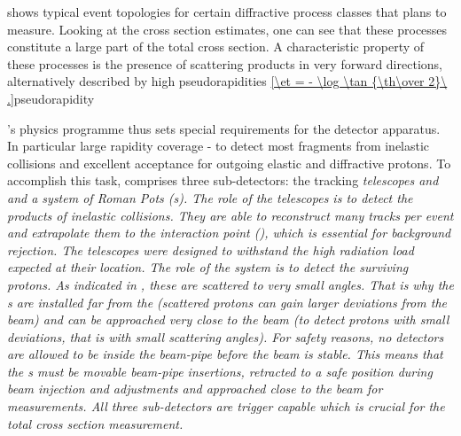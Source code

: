  shows typical event topologies for certain diffractive process classes that  plans to measure. Looking at the cross section estimates, one can see that these processes constitute a large part of the total cross section. A characteristic property of these processes is the presence of scattering products in very forward directions, alternatively described by high pseudorapidities
\eqref{\et = - \log \tan {\th\over 2}\ .}{pseudorapidity}



's physics programme thus sets special requirements for the detector apparatus. In particular large rapidity coverage - to detect most fragments from inelastic collisions and excellent acceptance for outgoing elastic and diffractive protons. To accomplish this task,  comprises three sub-detectors: the tracking \em{telescopes  and } and a system of \em{Roman Pots} (s). The role of the telescopes is to detect the products of inelastic collisions. They are able to reconstruct many tracks per event and extrapolate them to the interaction point (), which is essential for background rejection. The telescopes were designed to withstand the high radiation load expected at their location. The role of the  system is to detect the surviving protons. As indicated in , these are scattered to very small angles. That is why the s are installed far from the  (scattered protons can gain larger deviations from the beam) and can be approached very close to the beam (to detect protons with small deviations, that is with small scattering angles). For safety reasons, no detectors are allowed to be inside the beam-pipe before the beam is stable. This means that the s must be movable beam-pipe insertions, retracted to a safe position during beam injection and adjustments and approached close to the beam for measurements. All three sub-detectors are trigger capable which is crucial for the total cross section measurement.



